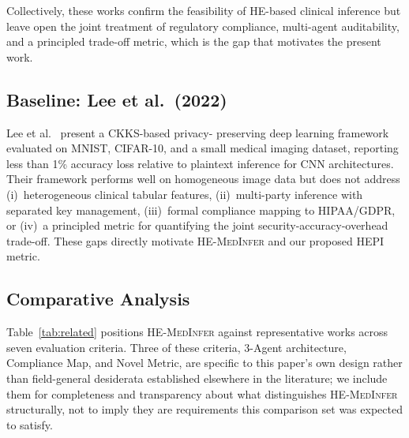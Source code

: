 \documentclass[journal,compsoc]{IEEEtran}
\newcommand{\HEPI}{\textsc{HEPI}}          %
\newcommand{\framework}{\textsc{HE-MedInfer}}
\begin{document}
Collectively, these works confirm the feasibility of HE-based clinical
inference but leave open the joint treatment of regulatory compliance,
multi-agent auditability, and a principled trade-off metric, which is the
gap that motivates the present work.

\subsection{Baseline: Lee et al.\ (2022)}

Lee et al.~\cite{lee2022privacypreserving} present a CKKS-based privacy-
preserving deep learning framework evaluated on MNIST, CIFAR-10, and a small
medical imaging dataset, reporting less than 1\% accuracy loss relative to
plaintext inference for CNN architectures. Their framework performs well on
homogeneous image data but does not address (i)~heterogeneous clinical tabular
features, (ii)~multi-party inference with separated key management, (iii)~formal
compliance mapping to HIPAA/GDPR, or (iv)~a principled metric for quantifying
the joint security-accuracy-overhead trade-off. These gaps directly motivate
\framework{} and our proposed \HEPI{} metric.

\subsection{Comparative Analysis}

Table~\ref{tab:related} positions \framework{} against representative works
across seven evaluation criteria. Three of these criteria, 3-Agent
architecture, Compliance Map, and Novel Metric, are specific to this paper's
own design rather than field-general desiderata established elsewhere in the
literature; we include them for completeness and transparency about what
distinguishes \framework{} structurally, not to imply they are requirements
this comparison set was expected to satisfy.
\end{document}
